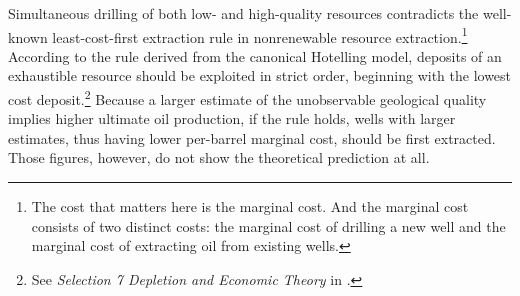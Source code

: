 Simultaneous drilling of both low- and high-quality resources contradicts the well-known least-cost-first extraction rule in nonrenewable resource extraction.\footnote{The cost that matters here is the marginal cost. And the marginal cost consists of two distinct costs: the marginal cost of drilling a new well and the marginal cost of extracting oil from existing wells.} According to the rule derived from the canonical Hotelling model, deposits of an exhaustible resource should be exploited in strict order, beginning with the lowest cost deposit.\footnote{See \textit{Selection 7 Depletion and Economic Theory} in \cite{Resource-Economics_Brooks_2015}.} Because a larger estimate of the unobservable geological quality implies higher ultimate oil production, if the rule holds, wells with larger estimates, thus having lower per-barrel marginal cost, should be first extracted. Those figures, however, do not show the theoretical prediction at all. 
